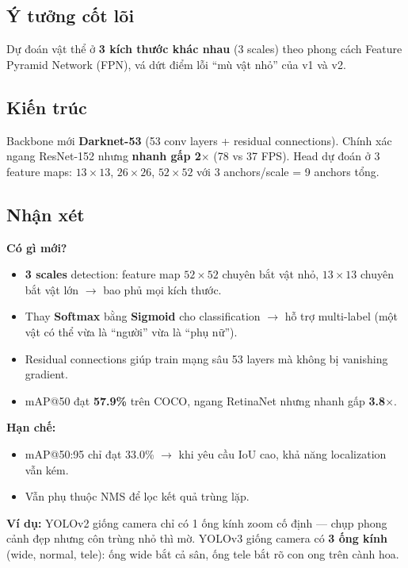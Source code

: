 \documentclass[12pt,a4paper]{report}
\begin{document}
\subsection{Ý tưởng cốt lõi}
Dự đoán vật thể ở \textbf{3 kích thước khác nhau} (3 scales) theo phong cách Feature Pyramid Network (FPN), vá dứt điểm lỗi ``mù vật nhỏ'' của v1 và v2.

\subsection{Kiến trúc}
Backbone mới \textbf{Darknet-53} (53 conv layers + residual connections). Chính xác ngang ResNet-152 nhưng \textbf{nhanh gấp 2$\times$} (78 vs 37 FPS). Head dự đoán ở 3 feature maps: $13\times13$, $26\times26$, $52\times52$ với 3 anchors/scale = 9 anchors tổng.

\subsection{Nhận xét}

\textbf{Có gì mới?}
\begin{itemize}
    \item \textbf{3 scales} detection: feature map $52\times52$ chuyên bắt vật nhỏ, $13\times13$ chuyên bắt vật lớn $\rightarrow$ bao phủ mọi kích thước.
    \item Thay \textbf{Softmax} bằng \textbf{Sigmoid} cho classification $\rightarrow$ hỗ trợ multi-label (một vật có thể vừa là ``người'' vừa là ``phụ nữ'').
    \item Residual connections giúp train mạng sâu 53 layers mà không bị vanishing gradient.
    \item mAP@50 đạt \textbf{57.9\%} trên COCO, ngang RetinaNet nhưng nhanh gấp \textbf{3.8$\times$}.
\end{itemize}

\textbf{Hạn chế:}
\begin{itemize}
    \item mAP@50:95 chỉ đạt 33.0\% $\rightarrow$ khi yêu cầu IoU cao, khả năng localization vẫn kém.
    \item Vẫn phụ thuộc NMS để lọc kết quả trùng lặp.
\end{itemize}

\textbf{Ví dụ:} YOLOv2 giống camera chỉ có 1 ống kính zoom cố định --- chụp phong cảnh đẹp nhưng côn trùng nhỏ thì mờ. YOLOv3 giống camera có \textbf{3 ống kính} (wide, normal, tele): ống wide bắt cả sân, ống tele bắt rõ con ong trên cành hoa.
\end{document}

